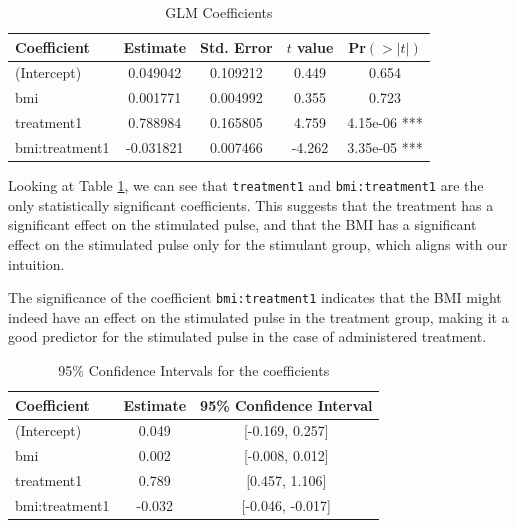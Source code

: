 \documentclass[10pt, a4paper]{article}
\begin{document}
\begin{table}[ht]
  \centering
  \begin{tabular}{lcccc}
    \toprule
    \textbf{Coefficient} & \textbf{Estimate} & \textbf{Std. Error} & \textbf{$t$ value} & \textbf{Pr$(>|t|)$} \\
    \midrule
    (Intercept)          & 0.049042          & 0.109212            & 0.449              & 0.654               \\
    bmi                  & 0.001771          & 0.004992            & 0.355              & 0.723               \\
    treatment1           & 0.788984          & 0.165805            & 4.759              & 4.15e-06 ***        \\
    bmi:treatment1       & -0.031821         & 0.007466            & -4.262             & 3.35e-05 ***        \\
    \bottomrule
  \end{tabular}
  \caption{GLM Coefficients}
  \label{tab:glm-coefficients}
\end{table}

Looking at Table \ref{tab:glm-coefficients}, we can see that \verb|treatment1| and \verb|bmi:treatment1| are the only statistically significant coefficients. This suggests that the treatment has a significant effect on the stimulated pulse, and that the BMI has a significant effect on the stimulated pulse only for the stimulant group, which aligns with our intuition.

The significance of the coefficient \verb|bmi:treatment1| indicates that the BMI might indeed have an effect on the stimulated pulse in the treatment group, making it a good predictor for the stimulated pulse in the case of administered treatment.

\begin{table}[ht]
  \centering
  \begin{tabular}{@{}lcc@{}}
    \toprule
    \textbf{Coefficient} & \textbf{Estimate} & \textbf{95\% Confidence Interval} \\
    \midrule
    (Intercept)          & 0.049             & [-0.169, 0.257]                   \\
    bmi                  & 0.002             & [-0.008, 0.012]                   \\
    treatment1           & 0.789             & [0.457, 1.106]                    \\
    bmi:treatment1       & -0.032            & [-0.046, -0.017]                  \\
    \bottomrule
  \end{tabular}
  \caption{95\% Confidence Intervals for the coefficients}
  \label{tab:glm-confidence-intervals}
\end{table}
\end{document}
